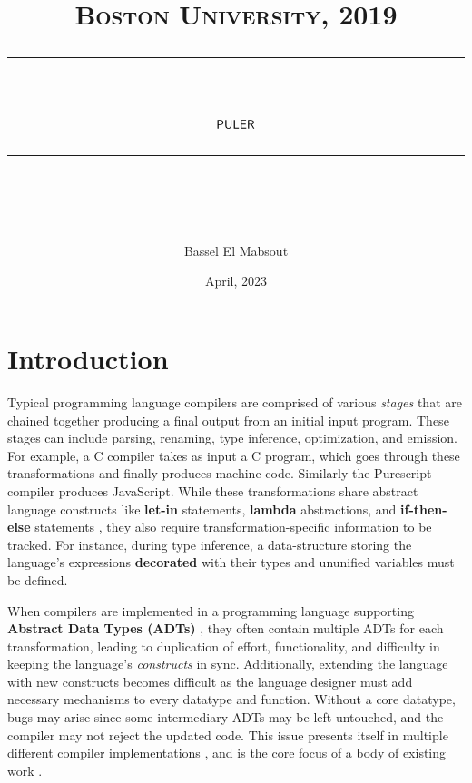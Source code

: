 \documentclass{article} %
\title{
\normalfont \normalsize 
\textsc{Boston University, 2019} \\
[10pt] 
\rule{\linewidth}{0.5pt} \\[6pt] 
\huge $\mathsf{PULER}$ \\
\rule{\linewidth}{2pt}  \\[10pt]
}
\author{Bassel El Mabsout}
\date{\normalsize April, 2023}
\begin{document}
\maketitle
\noindent

\tableofcontents

\newpage

\section{Introduction}
    Typical programming language compilers are comprised of various \textit{stages} that are chained together producing a final output from an initial input program.
    These stages can include parsing, renaming, type inference, optimization, and emission.
    For example, a C compiler takes as input a C program, which goes through these transformations and finally produces machine code.
    Similarly the Purescript \cite{purescript} compiler produces JavaScript. While these transformations share abstract language constructs like \textbf{let-in} statements, \textbf{lambda} abstractions, and \textbf{if-then-else} statements \cite{Pierce2002-px}, they also require transformation-specific information to be tracked.
    For instance, during type inference, a data-structure storing the language's expressions \textbf{decorated} with their types and ununified variables must be defined. \cite{JavaCompilerDesign}

    When compilers are implemented in a programming language supporting \textbf{Abstract Data Types (ADTs)} \cite{ADTs}, they often contain multiple ADTs for each transformation, leading to duplication of effort, functionality, and difficulty in keeping the language's \textit{constructs} in sync.
    Additionally, extending the language with new constructs becomes difficult as the language designer must add necessary mechanisms to every datatype and function.
    Without a core datatype, bugs may arise since some intermediary ADTs may be left untouched, and the compiler may not reject the updated code. This issue presents itself in multiple different compiler implementations \cite{GHC, ocaml}, and is the core focus of a body of existing work \cite{Torgersen2004, Axelsson, openfunctions}.
\end{document}
